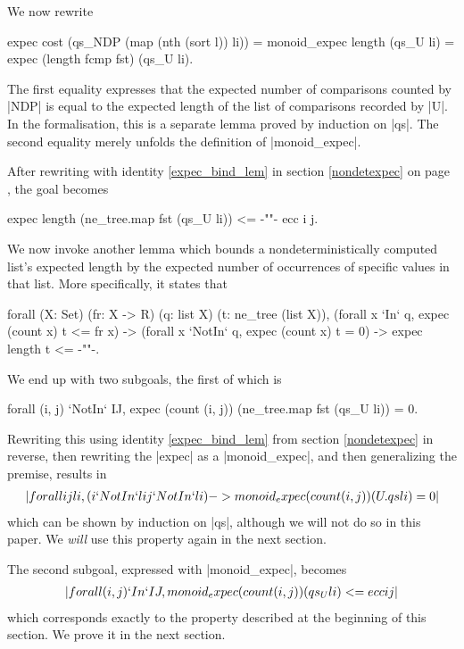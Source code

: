 \documentclass[runningheads]{llncs}
\begin{document}
We now rewrite
\begin{code}expec cost (qs_NDP (map (nth (sort l)) li))
  = monoid_expec length (qs_U li) = expec (length fcmp fst) (qs_U li).
\end{code}
The first equality expresses that the expected number of comparisons counted by |NDP| is equal to the expected length of the list of comparisons recorded by |U|. In the formalisation, this is a separate lemma proved by induction on |qs|. The second equality merely unfolds the definition of |monoid_expec|.

After rewriting with identity \ref{expec_bind_lem} in section \ref{nondetexpec} on page \pageref{expec_bind_lem}, the goal becomes
\begin{code}
  expec length (ne_tree.map fst (qs_U li)) <= {-""-} ecc i j.
\end{code}
We now invoke another lemma which bounds a nondeterministically computed list's expected length by the expected number of occurrences of specific values in that list. More specifically, it states that

\begin{code}
  forall (X: Set) (fr: X -> R) (q: list X) (t: ne_tree (list X)),
    (forall x `In` q, expec (count x) t <= fr x) ->
    (forall x `NotIn` q, expec (count x) t = 0) -> expec length t <= {-""-}.
\end{code}
We end up with two subgoals, the first of which is \begin{code}forall (i, j) `NotIn` IJ, expec (count (i, j)) (ne_tree.map fst (qs_U li)) = 0.\end{code} Rewriting this using identity \ref{expec_bind_lem} from section \ref{nondetexpec} in reverse, then rewriting the |expec| as a |monoid_expec|, and then generalizing the premise, results in
\begin{align}
  |forall i j li, (i `NotIn` li \/ j `NotIn` li) -> monoid_expec (count (i, j)) (U.qs li) = 0| \label{monoid_expec_zero_lem}
\end{align}
which can be shown by induction on |qs|, although we will not do so in this paper. 
We \emph{will} use this property again in the next section.

The second subgoal, expressed with |monoid_expec|, becomes
\begin{align}
  |forall (i, j) `In` IJ, monoid_expec (count (i, j)) (qs_U li) <= ecc i j| \label{monoid_expec_IJ_lem}
\end{align}
which corresponds exactly to the property described at the beginning of this section. We prove it in the next section.
\end{document}
